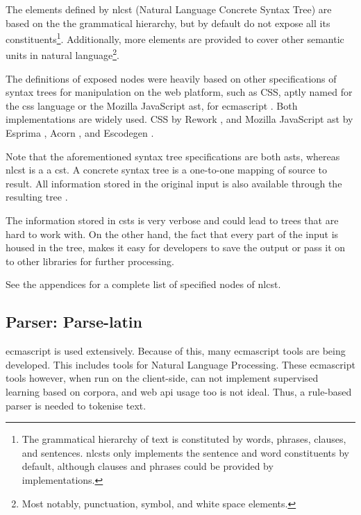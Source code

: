 The elements defined by \gls{nlcst} (Natural Language Concrete Syntax
Tree) are based on the the grammatical hierarchy, but by default do not
expose all its constituents\footnote{The grammatical hierarchy of text
  is constituted by words, phrases, clauses, and sentences.
  \glspl{nlcst} only implements the sentence and word constituents by
  default, although clauses and phrases could be provided by
  implementations.}. Additionally, more elements are provided to cover
other semantic units in natural language\footnote{Most notably,
  punctuation, symbol, and white space elements.}.

The definitions of exposed nodes were heavily based on other
specifications of syntax trees for manipulation on the web platform,
such as CSS, aptly named for the \acrshort{css} language
\autocite{reworkcss/css-source-code} or the Mozilla JavaScript
\acrshort{ast}, for \gls{ecmascript}
\autocite{mozilla.org-spidermonkey-parser_api}. Both implementations are
widely used. CSS by Rework \autocite{reworkcss/rework-source-code}, and
Mozilla JavaScript \gls{ast} by Esprima
\autocite{ariya/esprima-source-code}, Acorn
\autocite{marijnh/acorn-source-code}, and Escodegen
\autocite{constellation/escodegen-source-code}.

Note that the aforementioned syntax tree specifications are both
\glspl{ast}, whereas \gls{nlcst} is a a \gls{cst}. A concrete syntax
tree is a one-to-one mapping of source to result. All information stored
in the original input is also available through the resulting tree
\autocite{thegreenplace.net-abstract-concrete-syntax-trees}.

The information stored in \glspl{cst} is very verbose and could lead to
trees that are hard to work with. On the other hand, the fact that every
part of the input is housed in the tree, makes it easy for developers to
save the output or pass it on to other libraries for further processing.

See the appendices for a complete list of specified nodes of
\gls{nlcst}.

\subsection{Parser: Parse-latin}\label{parser-parse-latin}

\Gls{ecmascript} is used extensively. Because of this, many \gls{ecmascript} tools
are being developed. This includes tools for Natural Language
Processing. These \gls{ecmascript} tools however, when run on the client-side,
can not implement supervised learning based on corpora, and web
\gls{api} usage too is not ideal. Thus, a rule-based parser is needed to
tokenise text.

